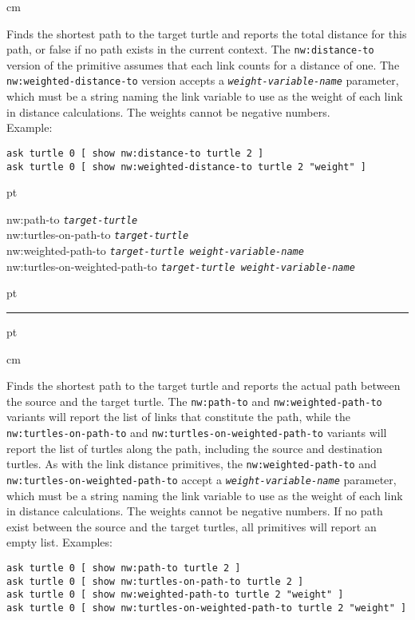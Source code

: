 \documentclass[10pt]{article}
\newenvironment{prim}{
  \vskip 6 pt
  \ttfamily
  \bfseries
}{
  \vskip 2 pt
  \hrule
  \vskip 6 pt
}
\newenvironment{doc}{
  \leftskip 0.5 cm
}
{}
\newcommand{\param}[1]{\texttt{\textit{\textmd{#1}}}}
\begin{document}
\begin{doc}
Finds the shortest path to the target turtle and reports the total distance for
this path, or false if no path exists in the current context. The
\texttt{nw:distance-to} version of the primitive assumes that each link counts
for a distance of one. The \texttt{nw:weighted-distance-to} version accepts a
\param{weight-variable-name} parameter, which must be a string naming the link
variable to use as the weight of each link in distance calculations. The weights cannot
be negative numbers.\\Example:

\begin{Verbatim}
ask turtle 0 [ show nw:distance-to turtle 2 ]
ask turtle 0 [ show nw:weighted-distance-to turtle 2 "weight" ]
\end{Verbatim}
\end{doc}

\begin{prim}
nw:path-to \param{target-turtle}\\
nw:turtles-on-path-to \param{target-turtle}\\
nw:weighted-path-to \param{target-turtle weight-variable-name}\\
nw:turtles-on-weighted-path-to \param{target-turtle weight-variable-name}
\end{prim}

\begin{doc}
Finds the shortest path to the target turtle and reports the actual path between
the source and the target turtle. The \texttt{nw:path-to} and
\texttt{nw:weighted-path-to} variants will report the list of links that
constitute the path, while the \texttt{nw:turtles-on-path-to} and
\texttt{nw:turtles-on-weighted-path-to} variants will report the list of turtles
along the path, including the source and destination turtles.
As with the link distance primitives, the \texttt{nw:weighted-path-to} and
\texttt{nw:turtles-on-weighted-path-to} accept a \param{weight-variable-name}
parameter, which must be a string naming the link variable to use as the weight
of each link in distance calculations. The weights cannot be negative numbers.
If no path exist between the source and the target turtles, all primitives will
report an empty list. Examples:

\begin{Verbatim}
ask turtle 0 [ show nw:path-to turtle 2 ]
ask turtle 0 [ show nw:turtles-on-path-to turtle 2 ]
ask turtle 0 [ show nw:weighted-path-to turtle 2 "weight" ]
ask turtle 0 [ show nw:turtles-on-weighted-path-to turtle 2 "weight" ]
\end{Verbatim}
\end{doc}
\end{document}
